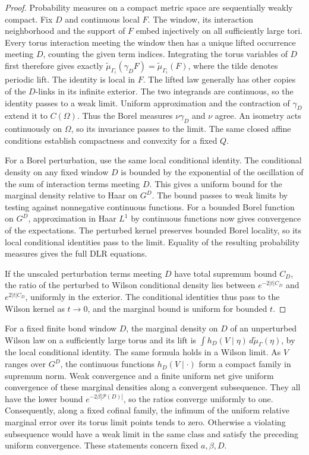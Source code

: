 \documentclass[11pt,letterpaper,reqno]{amsart}
\numberwithin{equation}{section}
\theoremstyle{definition}
\theoremstyle{remark}
\begin{document}
\begin{proof}
Probability measures on a compact metric space are sequentially
weakly compact. Fix \(D\) and continuous local \(F\). The window, its
interaction neighborhood and the support of \(F\) embed injectively on
all sufficiently large tori. Every torus interaction meeting
the window then has a unique lifted occurrence meeting \(D\),
counting the given term indices.
Integrating the torus variables of \(D\) first therefore gives exactly
\(\widetilde\mu_{\Gamma_i}(\gamma_DF)=\widetilde\mu_{\Gamma_i}(F)\),
where the tilde denotes periodic lift. The identity is local in
\(F\). The lifted law generally has other copies of the \(D\)-links
in its infinite exterior. The two integrands are continuous, so the
identity passes to a weak limit. Uniform approximation and the
contraction of \(\gamma_D\) extend it to \(C(\Omega)\).
Thus the Borel measures \(\nu\gamma_D\) and \(\nu\) agree.
An isometry acts continuously on \(\Omega\), so its invariance
passes to the limit. The same closed affine conditions establish
compactness and convexity for a fixed \(Q\).

For a Borel perturbation, use the same local conditional identity.
The conditional density on any fixed window \(D\) is bounded by
the exponential of the oscillation of the sum of interaction terms
meeting \(D\). This gives a uniform bound for the marginal density
relative to Haar on \(G^D\). The bound passes to weak limits by
testing against nonnegative continuous functions. For a bounded
Borel function on \(G^D\), approximation in Haar \(L^1\) by
continuous functions now gives convergence of the expectations.
The perturbed kernel preserves bounded Borel locality, so its
local conditional identities pass to the limit. Equality of the
resulting probability measures gives the full DLR equations.

If the unscaled perturbation terms meeting \(D\) have total supremum
bound \(C_D\), the ratio of the perturbed to Wilson conditional
density lies between \(e^{-2|t|C_D}\) and \(e^{2|t|C_D}\), uniformly
in the exterior. The conditional identities thus pass to the
Wilson kernel as \(t\to0\), and the marginal bound is uniform
for bounded \(t\).
\end{proof}

For a fixed finite bond window \(D\), the marginal density on \(D\)
of an unperturbed Wilson law on a sufficiently large torus and its lift is
\(\int h_D(V\mid\eta)\,d\widetilde\mu_\Gamma(\eta)\), by the local
conditional identity. The same formula holds in a Wilson limit.
As \(V\) ranges over \(G^D\), the continuous functions
\(h_D(V\mid\cdot)\) form a compact family in supremum norm.
Weak convergence and a finite uniform net give uniform convergence of
these marginal densities along a convergent subsequence. They all
have the lower bound \(e^{-2\beta|\mathcal P(D)|}\), so the
ratios converge uniformly to one. Consequently, along a fixed cofinal
family, the infimum of the uniform relative marginal error over its
torus limit points tends to zero. Otherwise a violating subsequence
would have a weak limit in the same class and satisfy the preceding
uniform convergence. These statements concern fixed \(a,\beta,D\).
\end{document}
